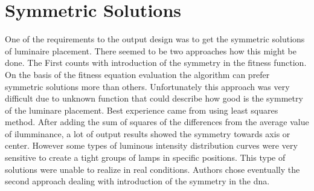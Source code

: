 \section{Symmetric Solutions}
One of the requirements to the output design was to get the symmetric solutions of luminaire placement. There seemed to be two approaches how this might be done. The First counts with introduction of the symmetry in the fitness function. On the basis of the fitness equation evaluation the algorithm can prefer symmetric solutions more than others. Unfortunately this approach was very difficult due to unknown function that could describe how good is the symmetry of the luminare placement. Best experience came from using least squares method. After adding the sum of squares of the differences from the average value of ilumminance, a lot of output results showed the symmetry towards axis or center. However some types of luminous intensity distribution curves were very sensitive to create a tight groups of lamps in specific positions. This type of solutions were unable to realize in real conditions.
Authors chose eventually the second approach dealing with introduction of the symmetry in the dna.